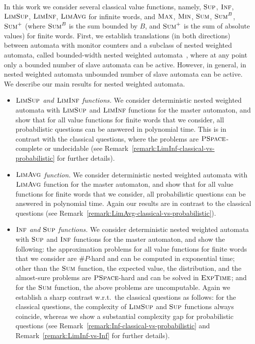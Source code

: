 \documentclass{lmcs}
\newcommand{\EXPTIME}{\textsc{ExpTime}{}}
\newcommand{\PSPACE}{\textsc{PSpace}{}}
\newcommand{\fsum}{\textsc{Sum}}
\newcommand{\fBsum}[1]{\textsc{Sum}^{#1}}
\newcommand{\fmax}{\textsc{Max}}
\newcommand{\fmin}{\textsc{Min}}
\newcommand{\flimavg}{\textsc{LimAvg}}
\newcommand{\fliminf}{\textsc{LimInf}}
\newcommand{\flimsup}{\textsc{LimSup}}
\newcommand{\fsup}{\textsc{Sup}}
\newcommand{\finf}{\textsc{Inf}}
\begin{document}
\smallskip{}
In this work we consider several classical value functions,
namely, $\fsup$, $\finf$, $\flimsup$, $\fliminf$, $\flimavg$ for infinite words,
and $\fmax$, $\fmin$, $\fsum$, $\fBsum{B}$, $\fsum^+$ (where $\fBsum{B}$ is the sum bounded by $B$,
and $\fsum^+$ is the sum of absolute values)
for finite words.
First, we establish translations (in both directions) between automata
with monitor counters and a subclass of nested weighted automata, called bounded-width nested weighted automata~\cite{nwa-mfcs},
where at any point only a bounded number of slave automata can be active.
However, in general, in nested weighted automata unbounded number of slave
automata can be active.
We describe our main results for nested weighted automata.
\begin{itemize}
\item {\em $\flimsup$ and $\fliminf$ functions.}
We consider deterministic nested weighted automata with $\flimsup$ and $\fliminf$
functions for the master automaton, and show that for all value functions for
finite words that we consider, all probabilistic questions can be answered
in polynomial time.
This is in contrast with the classical questions, where the problems are
$\PSPACE$-complete or undecidable (see Remark~\ref{remark:LimInf-classical-vs-probabilistic} for further details).

\item {\em $\flimavg$ function.}
We consider deterministic nested weighted automata with $\flimavg$
function for the master automaton, and show that for all value functions
for finite words that we consider, all probabilistic questions can be answered
in polynomial time.
Again our results are in contrast to the classical questions (see Remark~\ref{remark:LimAvg-classical-vs-probabilistic}).


\item {\em $\finf$ and $\fsup$ functions.}
We consider deterministic nested weighted automata with $\fsup$ and $\finf$
functions for the master automaton, and show the following:
the approximation problems for all value functions for finite words that we
consider are $\#P$-hard and can be computed in exponential time;
other than the $\fsum$ function, the expected value, the distribution, and the
almost-sure problems are $\PSPACE$-hard and can be solved in $\EXPTIME$;
and for the $\fsum$ function, the above problems are uncomputable.
Again we establish a sharp contrast w.r.t.\ the classical questions
as follows: for the classical questions, the complexity of $\flimsup$ and $\fsup$
functions always coincide, whereas we show a substantial complexity gap for
probabilistic questions (see Remark~\ref{remark:Inf-classical-vs-probabilistic} and Remark~\ref{remark:LimInf-vs-Inf} for
further details).




\end{itemize}
\end{document}
